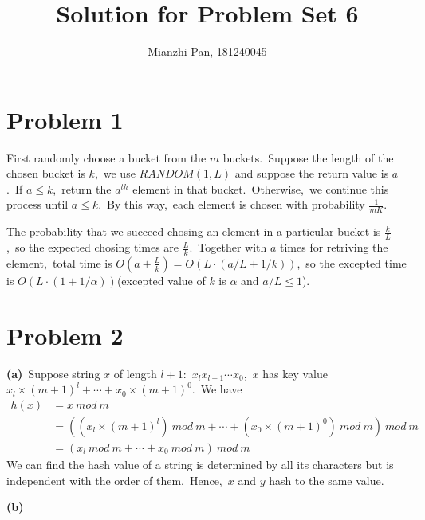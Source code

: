 \documentclass[]{article}
\title{Solution for Problem Set 6}
\author{Mianzhi Pan, 181240045}
\begin{document}
	\maketitle
	\section{Problem 1}
	First randomly choose a bucket from the $m$ buckets.\ Suppose the length of the chosen bucket is $k$,\ we use $RANDOM(1, L)$ and suppose the return value is $a$.\ If $a \leq k$,\ return the $a^{th}$ element in that bucket.\ Otherwise,\ we continue this process until $a \leq k$.\ By this way,\ each element is chosen with probability $\frac{1}{mK}$.
	
	The probability that we succeed chosing an element in a particular bucket is $\frac{k}{L}$,\ so the expected chosing times are $\frac{L}{k}$.\ Together with $a$ times for retriving the element,\ total time is $O(a + \frac{L}{k}) = O(L\cdot (a/L + 1/k))$,\ so the excepted time is $O(L\cdot (1 + 1/\alpha))$(excepted value of $k$ is $\alpha$ and $a/L \leq 1$).
	
	\section{Problem 2}
	\textbf{(a)}\ Suppose string $x$ of length $l+1$:\ $x_lx_{l-1}\cdots x_0$,\ $x$ has key value $x_l\times (m+1)^l + \cdots + x_0\times (m+1)^0$.\ We have
	\begin{equation*}
	\begin{aligned}
	h(x) &= x\ mod\ m\\
	& = ((x_l\times (m+1)^l)\ mod\ m + \cdots + (x_0\times (m+1)^0)\ mod\ m)\ mod\ m\\
	& = (x_l\ mod\ m + \cdots + x_0\ mod\ m)\ mod\ m
	\end{aligned}
	\end{equation*}
	We can find the hash value of a string is determined by all its characters but is independent with the order of them.\ Hence,\ $x$ and $y$ hash to the same value.
	
	\textbf{(b)}
\end{document}
